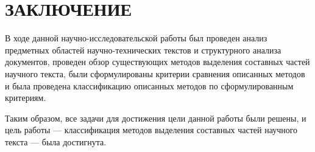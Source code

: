 \section*{ЗАКЛЮЧЕНИЕ}

В ходе данной научно-исследовательской работы был проведен анализ предметных областей научно-технических текстов и структурного анализа документов, проведен обзор существующих методов выделения составных частей научного текста, были сформулированы критерии сравнения описанных методов и была проведена классификацию описанных методов по сформулированным критериям.

Таким образом, все задачи для достижения цели данной работы были решены, и цель работы --- классификация методов выделения составных частей научного текста --- была достигнута.
